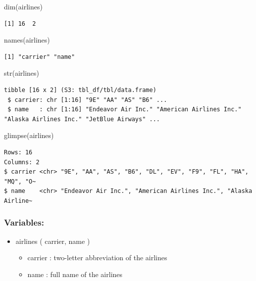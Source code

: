 \documentclass[
  10pt,
  letterpaper,
  DIV=11,
  numbers=noendperiod]{scrartcl}
\newenvironment{Shaded}{\begin{snugshade}}{\end{snugshade}}
\newcommand{\FunctionTok}[1]{\textcolor[rgb]{0.28,0.35,0.67}{#1}}
\newcommand{\NormalTok}[1]{\textcolor[rgb]{0.00,0.23,0.31}{#1}}
\providecommand{\tightlist}{%
  \setlength{\itemsep}{0pt}\setlength{\parskip}{0pt}}\usepackage{longtable,booktabs,array}
\begin{document}
\begin{Shaded}
\begin{Highlighting}[numbers=left,,]
\FunctionTok{dim}\NormalTok{(airlines)}
\end{Highlighting}
\end{Shaded}

\begin{verbatim}
[1] 16  2
\end{verbatim}

\begin{Shaded}
\begin{Highlighting}[numbers=left,,]
\FunctionTok{names}\NormalTok{(airlines)}
\end{Highlighting}
\end{Shaded}

\begin{verbatim}
[1] "carrier" "name"   
\end{verbatim}

\begin{Shaded}
\begin{Highlighting}[numbers=left,,]
\FunctionTok{str}\NormalTok{(airlines)}
\end{Highlighting}
\end{Shaded}

\begin{verbatim}
tibble [16 x 2] (S3: tbl_df/tbl/data.frame)
 $ carrier: chr [1:16] "9E" "AA" "AS" "B6" ...
 $ name   : chr [1:16] "Endeavor Air Inc." "American Airlines Inc." "Alaska Airlines Inc." "JetBlue Airways" ...
\end{verbatim}

\begin{Shaded}
\begin{Highlighting}[numbers=left,,]
\FunctionTok{glimpse}\NormalTok{(airlines)}
\end{Highlighting}
\end{Shaded}

\begin{verbatim}
Rows: 16
Columns: 2
$ carrier <chr> "9E", "AA", "AS", "B6", "DL", "EV", "F9", "FL", "HA", "MQ", "O~
$ name    <chr> "Endeavor Air Inc.", "American Airlines Inc.", "Alaska Airline~
\end{verbatim}

\subsubsection{Variables:}\label{variables-1}

\begin{itemize}
\tightlist
\item
  airlines ( carrier, name )

  \begin{itemize}
  \tightlist
  \item
    carrier : two-letter abbreviation of the airlines
  \item
    name : full name of the airlines
  \end{itemize}
\end{itemize}
\end{document}
